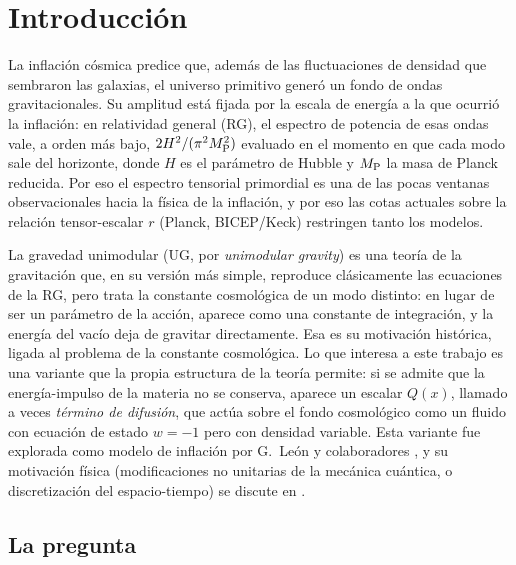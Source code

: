 \section{Introducción}
\label{sec:intro}

La inflación cósmica predice que, además de las fluctuaciones de densidad que sembraron las galaxias, el universo primitivo generó un fondo de ondas gravitacionales. Su amplitud está fijada por la escala de energía a la que ocurrió la inflación: en relatividad general (RG), el espectro de potencia de esas ondas vale, a orden más bajo, $2H^2/(\pi^2M_{\rm P}^2)$ evaluado en el momento en que cada modo sale del horizonte, donde $H$ es el parámetro de Hubble y $M_{\rm P}$ la masa de Planck reducida. Por eso el espectro tensorial primordial es una de las pocas ventanas observacionales hacia la física de la inflación, y por eso las cotas actuales sobre la relación tensor-escalar $r$ (Planck, BICEP/Keck) restringen tanto los modelos.

La gravedad unimodular (UG, por \emph{unimodular gravity}) es una teoría de la gravitación que, en su versión más simple, reproduce clásicamente las ecuaciones de la RG, pero trata la constante cosmológica de un modo distinto: en lugar de ser un parámetro de la acción, aparece como una constante de integración, y la energía del vacío deja de gravitar directamente. Esa es su motivación histórica, ligada al problema de la constante cosmológica. Lo que interesa a este trabajo es una variante que la propia estructura de la teoría permite: si se admite que la energía-impulso de la materia no se conserva, aparece un escalar $Q(x)$, llamado a veces \emph{término de difusión}, que actúa sobre el fondo cosmológico como un fluido con ecuación de estado $w=-1$ pero con densidad variable. Esta variante fue explorada como modelo de inflación por G.~León y colaboradores \cite{leon22,piccirilli23}, y su motivación física (modificaciones no unitarias de la mecánica cuántica, o discretización del espacio-tiempo) se discute en \cite{josset17,perez19}.

\subsection*{La pregunta}

